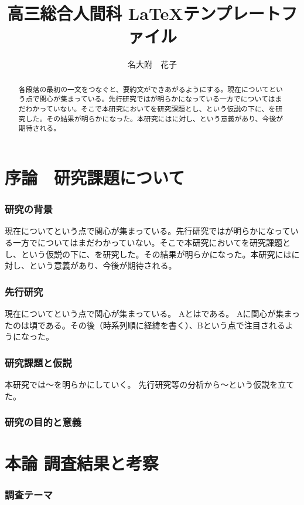\documentclass[10.5pt,twocolumn]{jsarticle}
\title{\fontsize{14pt}{0cm}\gt
高三総合人間科 \LaTeX テンプレートファイル}
\author{\fontsize{12pt}{0cm}\mc
名大附　花子}
\date{}
\begin{document}
\begin{abstract}
各段落の最初の一文をつなぐと、要約文ができあがるようにする。現在についてという点で関心が集まっている。先行研究ではが明らかになっている一方でについてはまだわかっていない。そこで本研究においてを研究課題とし、という仮説の下に、を研究した。その結果が明らかになった。本研究にはに対し、という意義があり、今後が期待される。
\end{abstract}
\maketitle

\part{序論　研究課題について}
\section{研究の背景}
現在についてという点で関心が集まっている。先行研究ではが明らかになっている一方でについてはまだわかっていない。そこで本研究においてを研究課題とし、という仮説の下に、を研究した。その結果が明らかになった。本研究にはに対し、という意義があり、今後が期待される。

\section{先行研究}
現在についてという点で関心が集まっている。
Aとはである。
Aに関心が集まったのは頃である。その後（時系列順に経緯を書く）、Bという点で注目されるようになった。

\section{研究課題と仮説}
本研究では〜を明らかにしていく。
先行研究等の分析から〜という仮説を立てた。

\section{研究の目的と意義}

\part{本論 調査結果と考察}
\section{調査テーマ}
\end{document}
